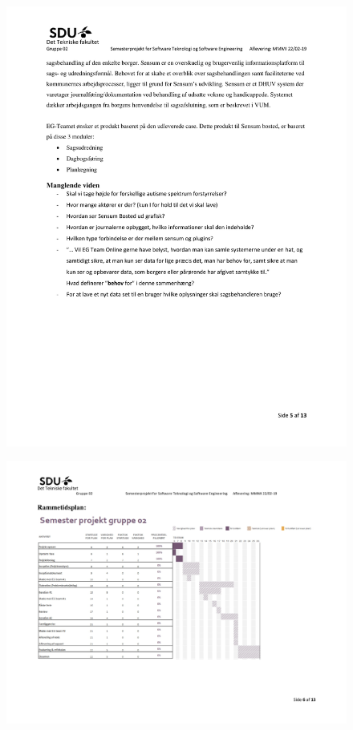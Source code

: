 \begin{figure}[hb]
  \includegraphics[scale = 0.33]{./PNG/Projektforslag/Projektforslag-05.jpg} 
\end{figure}
\begin{landscape}
\begin{figure}[hb]
  \includegraphics[scale = 0.33]{./PNG/Projektforslag/Projektforslag-06.jpg} 
\end{figure}
\end{landscape}

